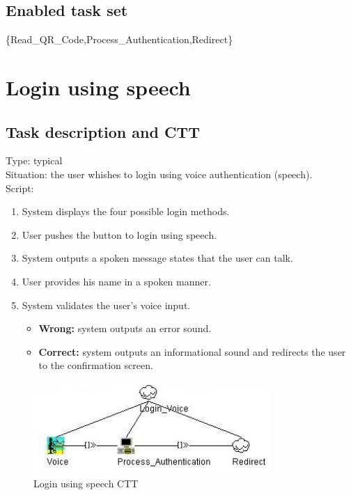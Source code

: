 \documentclass[11pt, a4paper,svglistings]{report}
\begin{document}
\subsection{Enabled task set}

\{Read\_QR\_Code,Process\_Authentication,Redirect\}


\newpage

\section{\label{subsec:loginSpeech}Login using speech}

\subsection{Task description and CTT}

Type: typical \\
Situation: the user whishes to login using voice authentication (speech). \\
Script:
\begin{enumerate}
\item System displays the four possible login methods.
\item User pushes the button to login using speech.
\item System outputs a spoken message states that the user can talk.
\item User provides his name in a spoken manner.
\item System validates the user's voice input.
\begin{itemize}
\item \textbf{Wrong:} system outputs an error sound.
\item \textbf{Correct:} system outputs an informational sound and redirects the user to the  confirmation screen.
\end{itemize}
\end{enumerate}

\begin{figure}[H]
\centering
    \includegraphics[width=0.8\textwidth]{LoginVoice.png}
  \caption[Speech CTT]{\label{fig:Logout}Login using speech CTT}
\end{figure}
\end{document}
